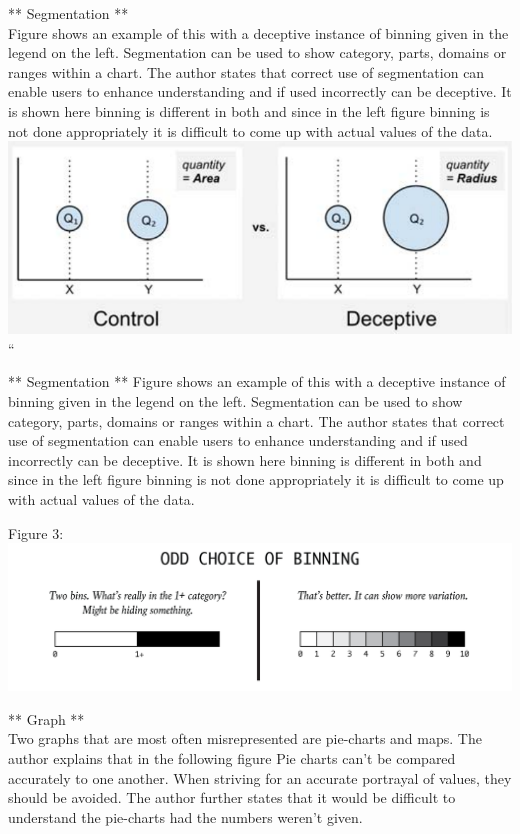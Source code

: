\documentclass[]{book}
\theoremstyle{definition}
\theoremstyle{definition}
\theoremstyle{definition}
\theoremstyle{remark}
\begin{document}
** Segmentation **\\
Figure shows an example of this with a deceptive instance of binning
given in the legend on the left. Segmentation can be used to show
category, parts, domains or ranges within a chart. The author states
that correct use of segmentation can enable users to enhance
understanding and if used incorrectly can be deceptive. It is shown here
binning is different in both and since in the left figure binning is not
done appropriately it is difficult to come up with actual values of the
data. \includegraphics{images/Quantity1.png} ``

** Segmentation ** Figure shows an example of this with a deceptive
instance of binning given in the legend on the left. Segmentation can be
used to show category, parts, domains or ranges within a chart. The
author states that correct use of segmentation can enable users to
enhance understanding and if used incorrectly can be deceptive. It is
shown here binning is different in both and since in the left figure
binning is not done appropriately it is difficult to come up with actual
values of the data.

Figure 3: \includegraphics{images/Segmentation 1.png}

** Graph **\\
Two graphs that are most often misrepresented are pie-charts and maps.
The author explains that in the following figure Pie charts can't be
compared accurately to one another. When striving for an accurate
portrayal of values, they should be avoided. The author further states
that it would be difficult to understand the pie-charts had the numbers
weren't given.
\end{document}
